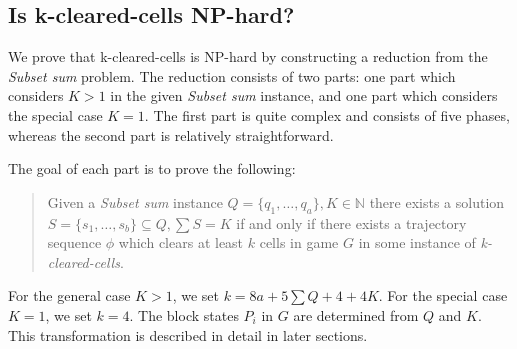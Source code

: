 \subsection{Is k-cleared-cells NP-hard?}
\label{sub:nphard}

We prove that k-cleared-cells is NP-hard by constructing a reduction from the \textit{Subset sum} problem. The reduction consists of two parts: one part which considers $K > 1$ in the given \textit{Subset sum} instance, and one part which considers the special case $K = 1$. The first part is quite complex and consists of five phases, whereas the second part is relatively straightforward.

The goal of each part is to prove the following: 

\begin{quote}
Given a \textit{Subset sum} instance $Q = \{q_1, \ldots, q_a\}, K \in \mathbb{N}$ there exists a solution $S = \{s_1, \ldots, s_b \} \subseteq Q, \sum S = K$ if and only if there exists a trajectory sequence $\phi$ which clears at least $k$ cells in game $G$ in some instance of \textit{k-cleared-cells}.
\end{quote}

For the general case $K > 1$, we set $k = 8a + 5 \sum Q + 4 + 4K$. For the special case $K = 1$, we set $k = 4$. The block states $P_i$ in $G$ are determined from $Q$ and $K$. This transformation is described in detail in later sections. 
















